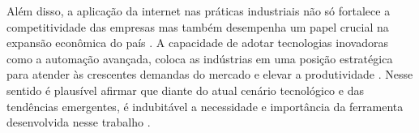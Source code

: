 Além disso, a aplicação da internet nas práticas industriais não só fortalece a competitividade das empresas mas também desempenha um papel crucial na expansão econômica do país \cite{industryiot}. A capacidade de adotar tecnologias inovadoras como a automação avançada, coloca as indústrias em uma posição estratégica para atender às crescentes demandas do mercado e elevar a produtividade \cite{industryinternet}. Nesse sentido é plausível afirmar que diante do atual cenário tecnológico e das tendências emergentes, é indubitável a necessidade e importância da ferramenta desenvolvida nesse trabalho \cite{industrychina}.